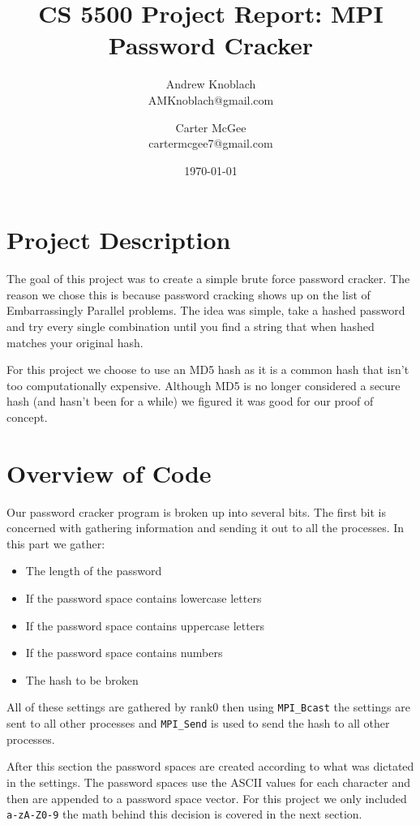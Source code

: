\documentclass[11pt]{article}
\title{CS 5500 Project Report: MPI Password Cracker}
\author{Andrew Knoblach \\ AMKnoblach@gmail.com \and  Carter McGee \\ cartermcgee7@gmail.com}
\date{\today}
\begin{document}
\maketitle

\section{Project Description}

The goal of this project was to create a simple brute force password cracker. The reason we chose this is because password cracking shows up on the list of Embarrassingly Parallel problems. The idea was simple, take a hashed password and try every single combination until you find a string that when hashed matches your original hash.

For this project we choose to use an MD5 hash as it is a common hash that isn't too computationally expensive. Although MD5 is no longer considered a secure hash (and hasn't been for a while) we figured it was good for our proof of concept.



\section{Overview of Code}

Our password cracker program is broken up into several bits.  The first bit is concerned with gathering information and sending it out to all the processes. In this part we gather:
\begin{itemize}
	\item The length of the password
	\item If the password space contains lowercase letters
	\item If the password space contains uppercase letters
	\item If the password space contains numbers
	\item The hash to be broken
\end{itemize}

All of these settings are gathered by rank0 then using \verb|MPI_Bcast| the settings are sent to all other processes and \verb|MPI_Send| is used to send the hash to all other processes.

After this section the password spaces are created according to what was dictated in the settings. The password spaces use the ASCII values for each character and then are appended to a password space vector. For this project we only included \verb|a-zA-Z0-9| the math behind this decision is covered in the next section. 
\end{document}
